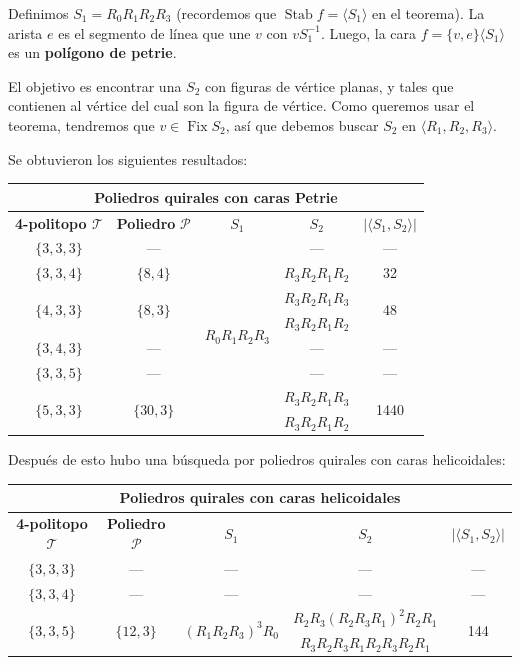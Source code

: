 \documentclass[spanish]{article}
\theoremstyle{definition}
\newcommand{\p}{\mathcal{P}}
\newcommand{\T}{\mathcal{T}}
\DeclareMathOperator{\Fix}{Fix}
\DeclareMathOperator{\Stab}{Stab}
\begin{document}
Definimos $S_1=R_0R_1R_2R_3$ (recordemos que $\Stab f=\langle S_1\rangle$ en el teorema).  La arista $e$ es el segmento de línea que une $v$ con $vS_1^{-1}$. Luego, la cara $f=\{v,e\}\langle S_1\rangle$ es un \textbf{polígono de petrie}.

El objetivo es encontrar una $S_2$ con figuras de vértice planas, y tales que contienen al vértice del cual son la figura de vértice. Como queremos usar el teorema, tendremos que $v\in\Fix S_2$, así que debemos buscar $S_2$ en $\langle R_1,R_2,R_3\rangle$.

Se obtuvieron los siguientes resultados:

\begin{center}
	\begin{tabular}{|c |c| c| c|c|}
	\hline
	\multicolumn{5}{|c|}{\textbf{Poliedros quirales con caras Petrie}}\\
	\hline\textbf{4-politopo $\T$} & \textbf{Poliedro} $\p$ &$S_1$&$S_2$&$|\langle S_1,S_2\rangle|$\\\hline\hline
	$\{3,3,3\}$&—&\multirow{8}{*}{$R_0R_1R_2R_3$}&—&—\\		\cline{1-2}\cline{4-5}
	$\{3,3,4\}$&$\{8,4\}$&&$R_3R_2R_1R_2$&32\\\cline{1-2}	\cline{4-5}
	\multirow{2}{*}{$\{4,3,3\}$}&\multirow{2}{*}{$\{8,3\}$}&&$R_3R_2R_1R_3$&\multirow{2}{*}{48}\\
	&&&$R_3R_2R_1R_2$&\\\cline{1-2}	\cline{4-5}
	$\{3,4,3\}$&—&&—&—\\\cline{1-2}	\cline{4-5}
	$\{3,3,5\}$&—&&—&—\\\cline{1-2}	\cline{4-5}
	\multirow{2}{*}{$\{5,3,3\}$}&\multirow{2}{*}{$\{30,3\}$}&&$R_3R_2R_1R_3$&\multirow{2}{*}{1440}\\
	&&&$R_3R_2R_1R_2$&\\\hline
\end{tabular}
\end{center}

Después de esto hubo una búsqueda por poliedros quirales con caras helicoidales:

\begin{center}
	\begin{tabular}{|c |c| c| c|c|}
		\hline
		\multicolumn{5}{|c|}{\textbf{Poliedros quirales con caras helicoidales}}\\
		\hline\textbf{4-politopo $\T$} & \textbf{Poliedro} $\p$ &$S_1$&$S_2$&$|\langle S_1,S_2\rangle|$\\\hline\hline
		$\{3,3,3\}$&—&—&—&—\\\hline
		$\{3,3,4\}$&—&—&—&—\\\hline
		\multirow{2}{*}{$\{3,3,5\}$}&\multirow{2}{*}{$\{12,3\}$}&\multirow{2}{*}{$(R_1R_2R_3)^3R_0$}&$R_2R_3(R_2R_3R_1)^2R_2R_1$&\multirow{2}{*}{144}\\
		&&&$R_3R_2R_3R_1R_2R_3R_2R_1$&\\
		\hline
	\end{tabular}
\end{center}
\end{document}
